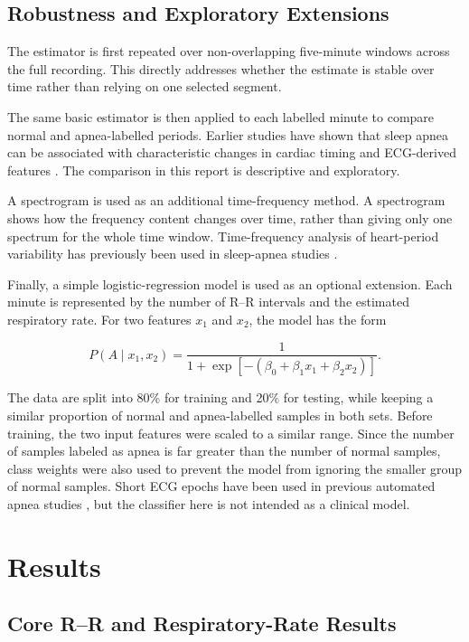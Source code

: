 \documentclass[a4paper,10.5pt,oneside]{report}
\begin{document}
\section{Robustness and Exploratory Extensions}

The estimator is first repeated over non-overlapping five-minute windows across
the full recording. This directly addresses whether the estimate is stable over
time rather than relying on one selected segment.

The same basic estimator is then applied to each labelled minute to compare
normal and apnea-labelled periods. Earlier studies have shown that sleep apnea
can be associated with characteristic changes in cardiac timing and
ECG-derived features \citep{penzel2002,dechazal2003}. The comparison in this
report is descriptive and exploratory.

A spectrogram is used as an additional time-frequency method. A spectrogram shows how the frequency content changes over time, rather than giving only one spectrum for the whole time window. Time-frequency analysis of
heart-period variability has previously been used in sleep-apnea studies
\citep{roche2003}.

Finally, a simple logistic-regression model is used as an optional extension.
Each minute is represented by the number of R--R intervals and the estimated
respiratory rate. For two features $x_1$ and $x_2$, the model has the form

\begin{equation}
P(A\mid x_1,x_2)
=
\frac{1}
{1+\exp[-(\beta_0+\beta_1x_1+\beta_2x_2)]}.
\label{eq:logistic}
\end{equation}

The data are split into 80\% for training and 20\% for testing, while keeping a similar proportion of normal and apnea-labelled samples in both sets. Before training, the two input features were scaled to a similar range. Since the number of samples labeled as apnea is far greater than the number of normal samples, class weights were also used to prevent the model from ignoring the smaller group of normal samples.
Short ECG epochs have been used in previous automated apnea studies
\citep{dechazal2004}, but the classifier here is not intended as a clinical
model.

\chapter{Results}

\section{Core R--R and Respiratory-Rate Results}
\end{document}
